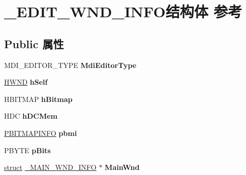 \hypertarget{struct___e_d_i_t___w_n_d___i_n_f_o}{}\section{\+\_\+\+E\+D\+I\+T\+\_\+\+W\+N\+D\+\_\+\+I\+N\+F\+O结构体 参考}
\label{struct___e_d_i_t___w_n_d___i_n_f_o}
\subsection*{Public 属性}
\begin{DoxyCompactItemize}
\item 
\mbox{\label{struct___e_d_i_t___w_n_d___i_n_f_o_aa710e0a3c1e3dce6f206fe33315fa96e}} 
M\+D\+I\+\_\+\+E\+D\+I\+T\+O\+R\+\_\+\+T\+Y\+PE {\bfseries Mdi\+Editor\+Type}
\item 
\mbox{\label{struct___e_d_i_t___w_n_d___i_n_f_o_aa40d4fbdc7d50a5e499116455ea609cf}} 
\hyperlink{interfacevoid}{H\+W\+ND} {\bfseries h\+Self}
\item 
\mbox{\label{struct___e_d_i_t___w_n_d___i_n_f_o_a9a8062d34dd76e51825fb6c4a44e4a01}} 
H\+B\+I\+T\+M\+AP {\bfseries h\+Bitmap}
\item 
\mbox{\label{struct___e_d_i_t___w_n_d___i_n_f_o_a93680f1c282969c0a53ecd97437d1ac4}} 
H\+DC {\bfseries h\+D\+C\+Mem}
\item 
\mbox{\label{struct___e_d_i_t___w_n_d___i_n_f_o_a5229bc91577a680658d516a56448d7dc}} 
\hyperlink{structtag_b_i_t_m_a_p_i_n_f_o}{P\+B\+I\+T\+M\+A\+P\+I\+N\+FO} {\bfseries pbmi}
\item 
\mbox{\label{struct___e_d_i_t___w_n_d___i_n_f_o_a1a85f1d29ba1c9cc5722a8a029dc9173}} 
P\+B\+Y\+TE {\bfseries p\+Bits}
\item 
\mbox{\label{struct___e_d_i_t___w_n_d___i_n_f_o_a8ef152b457eda4362d9569d9772b7679}} 
\hyperlink{interfacestruct}{struct} \hyperlink{struct___m_a_i_n___w_n_d___i_n_f_o}{\+\_\+\+M\+A\+I\+N\+\_\+\+W\+N\+D\+\_\+\+I\+N\+FO} $\ast$ {\bfseries Main\+Wnd}

\end{DoxyCompactItemize}
